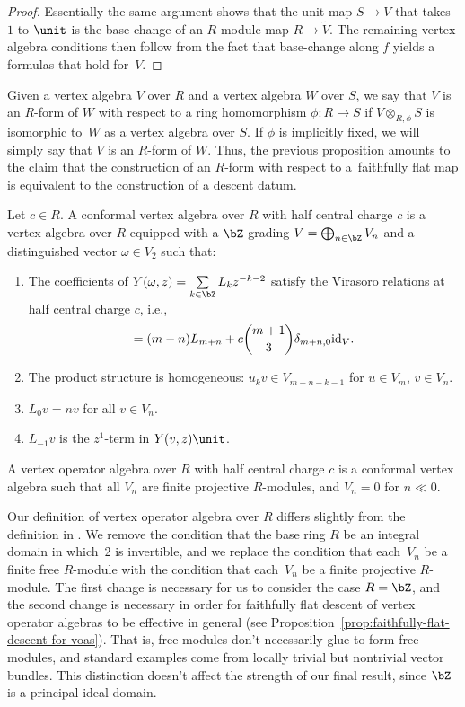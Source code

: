 \begin{proof}
Essentially the same argument shows that the unit map $S \to V$ that takes~$1$ to $\unit$ is the base change of an $R$-module map $R \to \tilde{V}$. The remaining vertex algebra conditions then follow from the fact that base-change along $f$ yields a formulas that hold for~$V$.
\end{proof}

Given a vertex algebra $V$ over $R$ and a vertex algebra $W$ over $S$, we say that $V$ is an $R$-form of $W$ with respect to a ring homomorphism $\phi\colon R \to S$ if $V \otimes_{R,\phi} S$ is isomorphic to~$W$ as a vertex algebra over $S$. If $\phi$ is implicitly fixed, we will simply say that $V$ is an $R$-form of $W$. Thus, the previous proposition amounts to the claim that the construction of an $R$-form with respect to a~faithfully flat map is equivalent to the construction of a descent datum.

\begin{defn}
Let $c\in R$. A conformal vertex algebra over $R$ with half central charge $c$ is a vertex algebra over $R$ equipped with a $\bZ$-grading $V = \bigoplus_{n \in \bZ} V_n$ and a distinguished vector $\omega \in V_2$ such that:
\begin{enumerate}\itemsep=0pt
\item The coefficients of $Y(\omega,z) = \sum\limits_{k \in \bZ} L_k z^{-k-2}$ satisfy the Virasoro relations at half central charge $c$, i.e.,
\begin{gather*} [L_m, L_n] = (m-n)L_{m+n} + c \binom{m+1}{3} \delta_{m+n,0} {\rm id}_V. \end{gather*}
\item The product structure is homogeneous: $u_k v \in V_{m+n-k-1}$ for $u \in V_m$, $v \in V_n$.
\item $L_0 v = nv$ for all $v \in V_n$.
\item $L_{-1}v$ is the $z^1$-term in $Y(v,z)\unit$.
\end{enumerate}
A vertex operator algebra over $R$ with half central charge $c$ is a conformal vertex algebra such that all $V_n$ are finite projective $R$-modules, and $V_n = 0$ for $n \ll 0$.
\end{defn}

\begin{rem}Our definition of vertex operator algebra over $R$ differs slightly from the defi\-nition in \cite{DR13}. We remove the condition that the base ring $R$ be an integral domain in which~2 is invertible, and we replace the condition that each~$V_n$ be a finite free $R$-module with the condition that each~$V_n$ be a finite projective $R$-module. The first change is necessary for us to consider the case $R = \bZ$, and the second change is necessary in order for faithfully flat descent of vertex operator algebras to be effective in general (see Proposition~\ref{prop:faithfully-flat-descent-for-voas}). That is, free modules don't necessarily glue to form free modules, and standard examples come from locally trivial but nontrivial vector bundles. This distinction doesn't affect the strength of our final result, since $\bZ$ is a principal ideal domain.
\end{rem}

